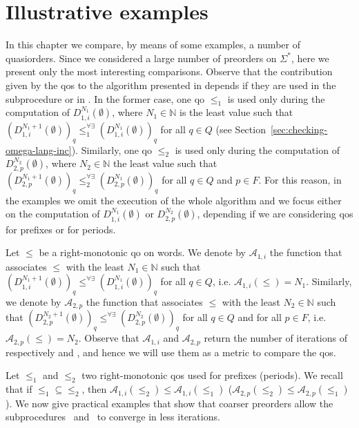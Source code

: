 \chapter{Illustrative examples}
\label{chap:examples}

In this chapter we compare, by means of some examples, a number of quasiorders.
Since we considered a large number of preorders on $\Sigma^*$, here we
present only the most interesting comparisons.
Observe that the contribution given by the qos to the algorithm
presented in \cite{ganty2020omegalang} depends if they are used
in the subprocedure  or in .
In the former case, one qo $\leq_1$ is used only during the computation of
$D_{1,i}^{N_1}(\emptyset)$, where $N_1  \in \mathbb{N}$ is the least value such that
$(D_{1,i}^{N_1+1}(\emptyset))_q \leq_1^{\forall \exists} (D_{1,i}^{N_1}(\emptyset))_q$
for all $q \in Q$ (see Section~\ref{sec:checking-omega-lang-inc}).
Similarly, one qo $\leq_2$ is used only during the computation of
$D_{2,p}^{N_2}(\emptyset)$, where $N_2 \in \mathbb{N}$
the least value such that
$(D_{2,p}^{N_1+1}(\emptyset))_q \leq_2^{\forall \exists} (D_{2,p}^{N_1}(\emptyset))_q$
for all $q \in Q$ and $p \in F$.
For this reason, in the examples we omit the execution of the whole algorithm
and we focus either on the computation of $D_{1,i}^{N_1}(\emptyset)$ or $D_{2,p}^{N_2}(\emptyset)$, depending if
we are considering qos for prefixes or for periods.

Let $\leq$ be a right-monotonic qo on words.
We denote by $\mathscr{A}_{1,i}$ the function that associates $\leq$
with the least $N_1 \in \mathbb{N}$ such that
$(D_{1,i}^{N_1+1}(\emptyset))_q \leq^{\forall \exists} (D_{1,i}^{N_1}(\emptyset))_q$
for all $q \in Q$, i.e. $\mathscr{A}_{1,i}(\leq) = N_1$.
Similarly, we denote by $\mathscr{A}_{2,p}$ the function that associates $\leq$
with the least $N_2 \in \mathbb{N}$ such that
$(D_{2,p}^{N_2+1}(\emptyset))_q \leq^{\forall \exists} (D_{2,p}^{N_2}(\emptyset))_q$
for all $q \in Q$ and for all $p \in F$, i.e. $\mathscr{A}_{2,p}(\leq) = N_2$.
Observe that $\mathscr{A}_{1,i}$ and $\mathscr{A}_{2,p}$ return the number of iterations
of respectively  and , and hence
we will use them as a metric to compare the qos.

Let $\leq_1$ and $\leq_2$ two right-monotonic qos used for prefixes (periods).
We recall that if $\mathord{\leq_1} \subseteq \mathord{\leq_2}$, then
$\mathord{\mathscr{A}_{1,i}(\leq_2)} \leq \mathord{\mathscr{A}_{1,i}(\leq_1)}$
($\mathord{\mathscr{A}_{2,p}(\leq_2)} \leq \mathord{\mathscr{A}_{2,p}(\leq_1)}$).
We now give practical examples that show that coarser preorders allow the
subprocedures~ and~ to converge in less iterations.

